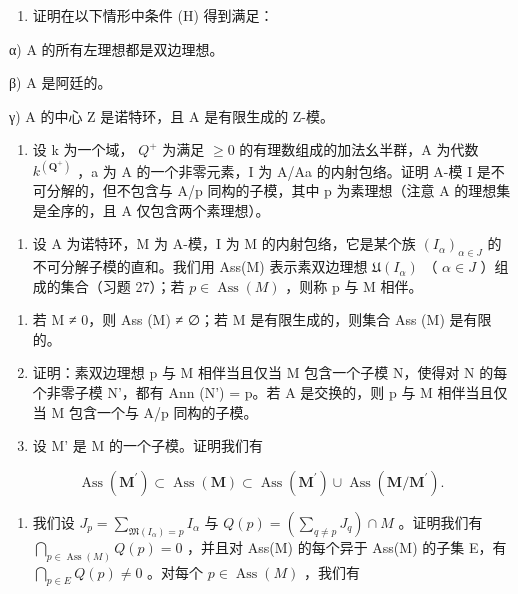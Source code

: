 \begin{enumerate}
\def\labelenumi{\alph{enumi})}
\setcounter{enumi}{4}
\tightlist
\item
  证明在以下情形中条件 (H) 得到满足：
\end{enumerate}

α) A 的所有左理想都是双边理想。

β) A 是阿廷的。

γ) A 的中心 Z 是诺特环，且 A 是有限生成的 Z-模。

\begin{enumerate}
\def\labelenumi{\alph{enumi})}
\setcounter{enumi}{5}
\tightlist
\item
  设 k 为一个域， \(Q^{+}\) 为满足 \(\geqslant 0\) 的有理数组成的加法幺半群，A 为代数 \(k^{(\mathbf{Q}^{+})}\) ，a 为 A 的一个非零元素，I 为 A/Aa 的内射包络。证明 A-模 I 是不可分解的，但不包含与 A/p 同构的子模，其中 p 为素理想（注意 A 的理想集是全序的，且 A 仅包含两个素理想）。
\end{enumerate}

\begin{enumerate}
\def\labelenumi{\arabic{enumi})}
\setcounter{enumi}{27}
\tightlist
\item
  设 A 为诺特环，M 为 A-模，I 为 M 的内射包络，它是某个族 \((I_{\alpha})_{\alpha \in J}\) 的不可分解子模的直和。我们用 Ass(M) 表示素双边理想 \(\mathfrak{U}(I_{\alpha})\) （ \(\alpha \in J\) ）组成的集合（习题 27）；若 \(p \in \operatorname{Ass}(M)\) ，则称 p 与 M 相伴。
\end{enumerate}

\begin{enumerate}
\def\labelenumi{\alph{enumi})}
\item
  若 M ≠ 0，则 Ass (M) ≠ ∅；若 M 是有限生成的，则集合 Ass (M) 是有限的。
\item
  证明：素双边理想 p 与 M 相伴当且仅当 M 包含一个子模 N，使得对 N 的每个非零子模 N'，都有 Ann (N') = p。若 A 是交换的，则 p 与 M 相伴当且仅当 M 包含一个与 A/p 同构的子模。
\item
  设 M' 是 M 的一个子模。证明我们有
\end{enumerate}

\[
\operatorname{Ass} \left(\mathbf {M} ^ {\prime}\right) \subset \operatorname{Ass} (\mathbf {M}) \subset \operatorname{Ass} \left(\mathbf {M} ^ {\prime}\right) \cup \operatorname{Ass} \left(\mathbf {M} / \mathbf {M} ^ {\prime}\right).
\]

\begin{enumerate}
\def\labelenumi{\alph{enumi})}
\setcounter{enumi}{3}
\tightlist
\item
  我们设 \(J_{p} = \sum_{\mathfrak{M}(I_{\alpha}) = p} I_{\alpha}\) 与 \(Q(p) = \left( \sum_{q \neq p} J_{q} \right) \cap M\) 。证明我们有 \(\bigcap_{p \in \operatorname{Ass}(M)} Q(p) = 0\) ，并且对 Ass(M) 的每个异于 Ass(M) 的子集 E，有 \(\bigcap_{p \in E} Q(p) \neq 0\) 。对每个 \(p \in \operatorname{Ass}(M)\) ，我们有
\end{enumerate}


